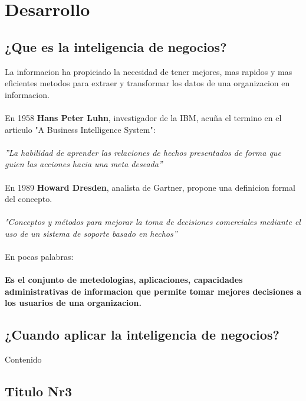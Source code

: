 \documentclass[twoside,twocolumn]{article}
\begin{document}

\section{Desarrollo}

\subsection{¿Que es la inteligencia de negocios?}

La informacion ha propiciado la necesidad de tener mejores, mas rapidos y mas eficientes metodos para extraer y transformar los datos de una organizacion en informacion.
\\ \\
En 1958 \textbf{Hans Peter Luhn}, investigador de la IBM, acuña el termino en el articulo "A Business Intelligence System":
\\ \\
\textsl{''La habilidad de aprender las relaciones de hechos presentados de forma que guien las acciones hacia una meta deseada''}
\\ \\
En 1989 \textbf{Howard Dresden}, analista de Gartner, propone una definicion formal del concepto.
\\ \\
\textsl{"Conceptos y métodos para mejorar la toma de decisiones comerciales mediante el uso de un sistema de soporte basado en hechos''}
\\ \\
En pocas palabras: \\ \\
\textbf{Es el conjunto de metedologias, aplicaciones, capacidades administrativas de informacion que permite tomar mejores decisiones a los usuarios de una organizacion.}


\subsection{¿Cuando aplicar la inteligencia de negocios?}

Contenido

\subsection{Titulo Nr3}
\end{document}
